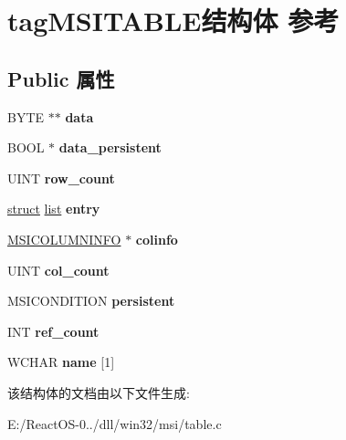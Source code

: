 \hypertarget{structtag_m_s_i_t_a_b_l_e}{}\section{tag\+M\+S\+I\+T\+A\+B\+L\+E结构体 参考}
\label{structtag_m_s_i_t_a_b_l_e}
\subsection*{Public 属性}
\begin{DoxyCompactItemize}
\item 
\mbox{\label{structtag_m_s_i_t_a_b_l_e_a3e90a7d1353b457a5759860cc0d369b6}} 
B\+Y\+TE $\ast$$\ast$ {\bfseries data}
\item 
\mbox{\label{structtag_m_s_i_t_a_b_l_e_a4d094529b5608d7822ca28c908408e73}} 
B\+O\+OL $\ast$ {\bfseries data\+\_\+persistent}
\item 
\mbox{\label{structtag_m_s_i_t_a_b_l_e_a94a142cc4b8ffcbe1a18f6c02ccaade5}} 
U\+I\+NT {\bfseries row\+\_\+count}
\item 
\mbox{\label{structtag_m_s_i_t_a_b_l_e_aa27e58a33b43b7eb5330bbe92240f507}} 
\hyperlink{interfacestruct}{struct} \hyperlink{classlist}{list} {\bfseries entry}
\item 
\mbox{\label{structtag_m_s_i_t_a_b_l_e_acef46d91db549701ea358529da8d7643}} 
\hyperlink{structtag_m_s_i_c_o_l_u_m_n_i_n_f_o}{M\+S\+I\+C\+O\+L\+U\+M\+N\+I\+N\+FO} $\ast$ {\bfseries colinfo}
\item 
\mbox{\label{structtag_m_s_i_t_a_b_l_e_ac653e168ae3341aa4a64cd82e975c285}} 
U\+I\+NT {\bfseries col\+\_\+count}
\item 
\mbox{\label{structtag_m_s_i_t_a_b_l_e_a1ce7227c8fb67fc11a01e9a216bf81b7}} 
M\+S\+I\+C\+O\+N\+D\+I\+T\+I\+ON {\bfseries persistent}
\item 
\mbox{\label{structtag_m_s_i_t_a_b_l_e_acbaef1ad5dbe8a62b3a94f48a628ae62}} 
I\+NT {\bfseries ref\+\_\+count}
\item 
\mbox{\label{structtag_m_s_i_t_a_b_l_e_a87ed07b33f7b07a6f66f5922cdfa6f64}} 
W\+C\+H\+AR {\bfseries name} \mbox{[}1\mbox{]}
\end{DoxyCompactItemize}


该结构体的文档由以下文件生成\+:\begin{DoxyCompactItemize}
\item 
E\+:/\+React\+O\+S-\/0../dll/win32/msi/table.\+c\end{DoxyCompactItemize}
